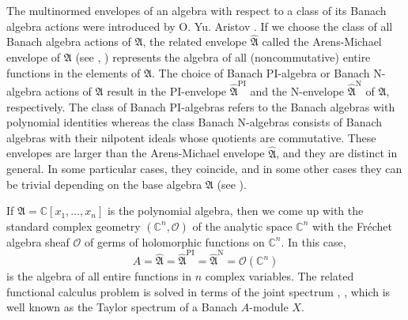 \documentclass[12pt]{amsart}%
\theoremstyle{plain}
\numberwithin{equation}{section}
\numberwithin{equation}{section}
\numberwithin{theorem}{section}
\numberwithin{lemma}{section}
\numberwithin{remark}{section}
\numberwithin{example}{section}
\numberwithin{proposition}{section}
\numberwithin{definition}{section}
\numberwithin{corollary}{section}
\begin{document}
The multinormed envelopes of an algebra with respect to a class of its Banach
algebra actions were introduced by O. Yu. Aristov \cite{Aris}. If we choose
the class of all Banach algebra actions of $\mathfrak{A}$, the related
envelope $\widehat{\mathfrak{A}}$ called the Arens-Michael envelope of
$\mathfrak{A}$ (see \cite[5]{Tay1}, \cite[5.2.21]{Hel}) represents the algebra
of all (noncommutative) entire functions in the elements of $\mathfrak{A}$.
The choice of Banach PI-algebra or Banach N-algebra actions of $\mathfrak{A}$
result in the PI-envelope $\widehat{\mathfrak{A}}^{\text{PI}}$ and the
N-envelope $\widehat{\mathfrak{A}}^{\text{N}}$ of $\mathfrak{A}$,
respectively. The class of Banach PI-algebras refers to the Banach algebras
with polynomial identities whereas the class Banach N-algebras consists of
Banach algebras with their nilpotent ideals whose quotients are commutative.
These envelopes are larger than the Arens-Michael envelope
$\widehat{\mathfrak{A}}$, and they are distinct in general. In some particular
cases, they coincide, and in some other cases they can be trivial depending on
the base algebra $\mathfrak{A}$ (see \cite{DosiSS}).

If $\mathfrak{A}=\mathbb{C}\left[  x_{1},\ldots,x_{n}\right]  $ is the
polynomial algebra, then we come up with the standard complex geometry
$\left(  \mathbb{C}^{n},\mathcal{O}\right)  $ of the analytic space
$\mathbb{C}^{n}$ with the Fr\'{e}chet algebra sheaf $\mathcal{O}$ of germs of
holomorphic functions on $\mathbb{C}^{n}$. In this case,
\[
A=\widehat{\mathfrak{A}}=\widehat{\mathfrak{A}}^{\text{PI}}%
=\widehat{\mathfrak{A}}^{\text{N}}=\mathcal{O}\left(  \mathbb{C}^{n}\right)
\]
is the algebra of all entire functions in $n$ complex variables. The related
functional calculus problem is solved in terms of the joint spectrum
\cite{Tay}, \cite[2.5]{EP}, which is well known as the Taylor spectrum of a
Banach $A$-module $X$.
\end{document}
